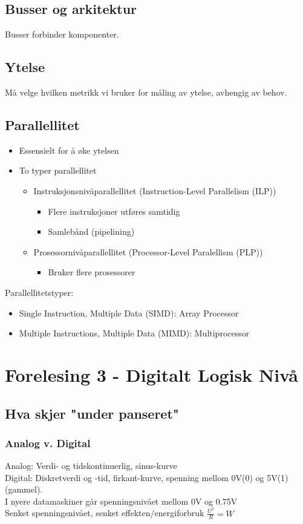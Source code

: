 \documentclass{article}
\begin{document}
			\subsection{Busser og arkitektur}
				Busser forbinder komponenter.
			\subsection{Ytelse}
				Må velge hvilken metrikk vi bruker for måling av ytelse, avhengig av behov.
			\subsection{Parallellitet}
				\begin{itemize}
					\item Essensielt for å øke ytelsen
					\item To typer parallellitet
						\begin{itemize}
							\item Instruksjonsnivåparallellitet (Instruction-Level Parallelism (ILP))
								\begin{itemize}
									\item Flere instruksjoner utføres samtidig
									\item Samlebånd (pipelining)
								\end{itemize}
							\item Prosessornivåparallellitet (Processor-Level Paralellism (PLP))
								\begin{itemize}
									\item Bruker flere prosessorer
								\end{itemize}
						\end{itemize}
				\end{itemize}
				Parallellitetstyper:
				\begin{itemize}
					\item  Single Instruction, Multiple Data (SIMD): Array Processor
					\item Multiple Instructions, Multiple Data (MIMD): Multiprocessor
				\end{itemize}
			\section{Forelesing 3 - Digitalt Logisk Nivå}
				\subsection{Hva skjer "under panseret"}
					\subsubsection{Analog v. Digital}
						Analog: Verdi- og tidskontinuerlig, sinus-kurve \\
						Digital: Diskretverdi og -tid, firkant-kurve, spenning mellom 0V(0) og 5V(1) (gammel). \\
						I nyere datamaskiner går spenningsnivået mellom 0V og 0.75V \\
						\indent Senket spenningsnivået, senket effekten/energiforbruk $\frac{U^2}{R} = W$
\end{document}
